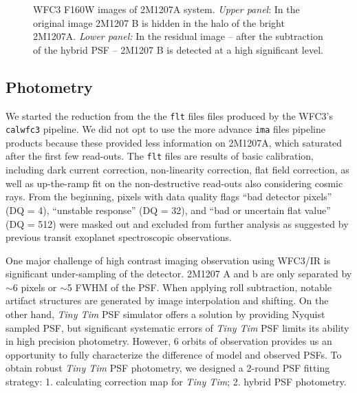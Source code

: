 \documentclass[apj]{emulateapj}
\newcommand{\ima}{\texttt{ima} files }
\newcommand{\flt}{\texttt{flt} files }
\newcommand{\tinytim}{\textit{Tiny Tim}}
\begin{document}

\begin{figure}
  \centering
  \caption{WFC3 F160W images of 2M1207A system. {\em Upper panel}: In the original image 
    2M1207 B is hidden in the halo of the bright 2M1207A.   {\em Lower panel:} In the residual image -- after the subtraction of the hybrid PSF -- 2M1207 B is detected at a high significant level.}
  \label{fig:1}
\end{figure}

\subsection{Photometry}

We started the reduction from the the \flt files produced by the
WFC3's \texttt{calwfc3} pipeline. We did not opt to use the more
advance \ima pipeline products because these provided less information
on 2M1207A, which saturated after the first few read-outs.  The \flt
are results of basic calibration, including dark current correction,
non-linearity correction, flat field correction, as well as
up-the-ramp fit on the non-destructive read-outs also considering
cosmic rays. From the beginning, pixels with data quality flags ``bad
detector pixels'' (DQ = 4), ``unstable response'' (DQ = 32), and ``bad
or uncertain flat value'' (DQ = 512) were masked out and excluded from
further analysis as suggested by previous transit exoplanet
spectroscopic observations\citep[e.g.][]{Berta2012, Kreidberg2014}.


One major challenge of high contrast imaging observation using WFC3/IR
is significant under-sampling of the detector.  2M1207 A and b are
only separated by $\sim6$ pixels or $\sim$5 FWHM of the PSF. When
applying roll subtraction, notable artifact structures are generated
by image interpolation and shifting. On the other hand, \tinytim{} PSF
simulator\citep{Krist1995} offers a solution by providing Nyquist
sampled PSF, but significant systematic errors of \tinytim{} PSF
 limits its ability in high precision
photometry\citep{Biretta2014}. However, 6 orbits of observation
provides us an opportunity to
fully characterize the difference of model and observed PSFs. To obtain
robust \tinytim{} PSF photometry,  we designed a 2-round PSF fitting strategy: 1. calculating
correction map for \tinytim{}; 2. hybrid PSF photometry.
\end{document}
